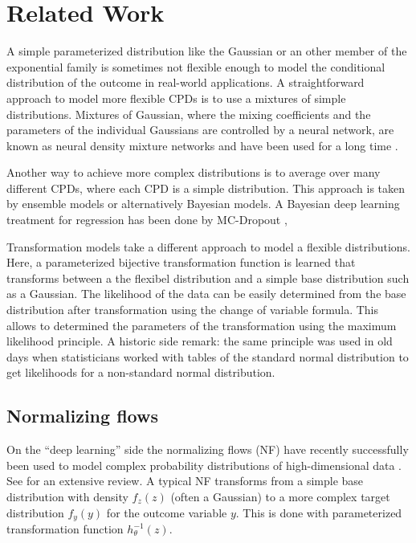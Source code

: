 \documentclass[a4paper,conference]{IEEEtran}
\begin{document}
\section{Related Work}
A simple parameterized distribution like the Gaussian or an other member of the exponential family is sometimes not flexible enough to model the conditional distribution of the outcome in real-world applications.  A straightforward approach to model more flexible CPDs is to use a mixtures of simple distributions. Mixtures of Gaussian, where the mixing coefficients and the parameters of the individual Gaussians are controlled by a neural network, are known as neural density mixture networks and have been used for a long time \cite{Bishop1994}.

Another way to achieve more complex distributions is to average over many different CPDs, where each  CPD is a simple distribution. This approach is taken by  ensemble models \cite{NIPS2017_7219} or alternatively Bayesian models. A Bayesian deep learning treatment for regression has been done by MC-Dropout \cite{Gal2015}, \cite{Gal2017b} 

Transformation models take a different approach to model a flexible distributions. Here, a parameterized bijective transformation function is learned that transforms between a the flexibel distribution and a simple base distribution such as a Gaussian. The likelihood of the data can be easily determined from the base distribution after transformation using the change of variable formula. This allows to determined the parameters of the transformation using the maximum likelihood principle. A historic side remark: the same principle was used in old days when statisticians worked with tables of the standard normal distribution to get likelihoods for a non-standard normal distribution. 



\subsection{Normalizing flows}
On the “deep learning” side the normalizing flows (NF) have recently successfully been used to model complex probability distributions of high-dimensional data \cite{Rezende2015}. See  \cite{Papamakarios2019} for an extensive review. A typical NF transforms from a simple base distribution with density $f_z(z)$ (often a Gaussian) to a more complex target distribution $f_y(y)$ for the outcome variable $y$. This is done with parameterized transformation function $h_{\theta}^{-1}(z)$.
\end{document}
